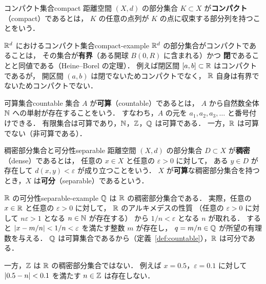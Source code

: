 \begin{definition}{コンパクト集合}{compact}
  距離空間 $(X, d)$ の部分集合 $K \subset X$ が\textbf{コンパクト}（compact）であるとは，
  $K$ の任意の点列が $K$ の点に収束する部分列を持つことをいう．
\end{definition}

\begin{example}{$\mathbb{R}^d$ におけるコンパクト集合}{compact-example}
  $\mathbb{R}^d$ の部分集合がコンパクトであることは，
  その集合が\textbf{有界}（ある開球 $B(0, R)$ に含まれる）かつ
  \textbf{閉}であることと同値である（Heine--Borel の定理）．
  例えば閉区間 $[a, b] \subset \mathbb{R}$ はコンパクトであるが，
  開区間 $(a, b)$ は閉でないためコンパクトでなく，
  $\mathbb{R}$ 自身は有界でないためコンパクトでない．
\end{example}

\begin{definition}{可算集合}{countable}
  集合 $A$ が\textbf{可算}（countable）であるとは，
  $A$ から自然数全体 $\mathbb{N}$ への単射が存在することをいう．
  すなわち，$A$ の元を $a_1, a_2, a_3, \ldots$ と番号付けできる．
  有限集合は可算であり，$\mathbb{N}$，$\mathbb{Z}$，$\mathbb{Q}$ は可算である．
  一方，$\mathbb{R}$ は可算でない（非可算である）．
\end{definition}

\begin{definition}{稠密部分集合と可分性}{separable}
  距離空間 $(X, d)$ の部分集合 $D \subset X$ が\textbf{稠密}（dense）であるとは，
  任意の $x \in X$ と任意の $\varepsilon > 0$ に対して，
  ある $y \in D$ が存在して $d(x, y) < \varepsilon$ が成り立つことをいう．
  $X$ が\textbf{可算}な稠密部分集合を持つとき，$X$ は\textbf{可分}（separable）であるという．
\end{definition}

\begin{example}{$\mathbb{R}$ の可分性}{separable-example}
  $\mathbb{Q}$ は $\mathbb{R}$ の稠密部分集合である．
  実際，任意の $x \in \mathbb{R}$ と任意の $\varepsilon > 0$ に対して，
  $\mathbb{R}$ のアルキメデスの性質
  （任意の $\varepsilon > 0$ に対して $n\varepsilon > 1$ となる $n \in \mathbb{N}$ が存在する）
  から $1/n < \varepsilon$ となる $n$ が取れる．
  すると $\lvert x - m/n \rvert < 1/n < \varepsilon$ を満たす整数 $m$ が存在し，
  $q = m/n \in \mathbb{Q}$ が所望の有理数を与える．
  $\mathbb{Q}$ は可算集合であるから（定義~\ref{def:countable}），$\mathbb{R}$ は可分である．

  一方，$\mathbb{Z}$ は $\mathbb{R}$ の稠密部分集合ではない．
  例えば $x = 0.5$，$\varepsilon = 0.1$ に対して
  $\lvert 0.5 - n \rvert < 0.1$ を満たす $n \in \mathbb{Z}$ は存在しない．
\end{example}


